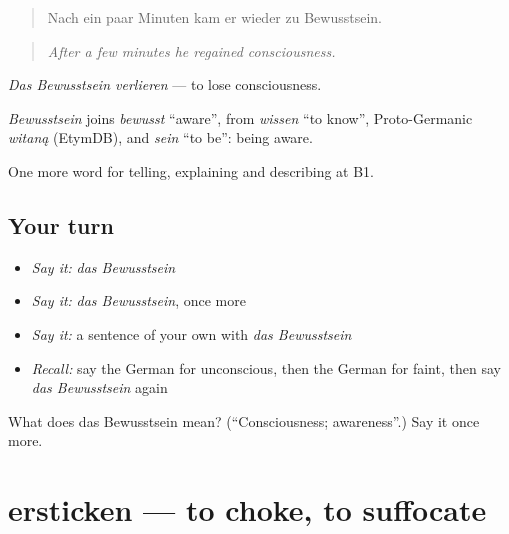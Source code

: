 \begin{quote}
Nach ein paar Minuten kam er wieder zu Bewusstsein.
\end{quote}

\begin{quote}
\emph{After a few minutes he regained consciousness.}
\end{quote}

\emph{Das Bewusstsein verlieren} — to lose consciousness.

\begin{cousinweb}
\emph{Bewusstsein} joins \emph{bewusst} \textquotedblleft{}aware\textquotedblright{}, from \emph{wissen} \textquotedblleft{}to know\textquotedblright{}, Proto-Germanic \emph{witaną} (EtymDB), and \emph{sein} \textquotedblleft{}to be\textquotedblright{}: being aware.
\end{cousinweb}

\begin{grammarlens}[title={What you've built}]
One more word for telling, explaining and describing at B1.
\end{grammarlens}

\subsection*{Your turn}
\begin{itemize}
\raggedright
  \item \emph{Say it:} \emph{das Bewusstsein}
  \item \emph{Say it:} \emph{das Bewusstsein}, once more
  \item \emph{Say it:} a sentence of your own with \emph{das Bewusstsein}
  \item \emph{Recall:} say the German for unconscious, then the German for faint, then say \emph{das Bewusstsein} again
\end{itemize}

\begin{tcolorbox}[breakable,colback=teal!4,colframe=teal!35!black,title={Before you move on}]
What does das Bewusstsein mean? (\textquotedblleft{}Consciousness; awareness\textquotedblright{}.) Say it once more.
\end{tcolorbox}
\section[ersticken]{ersticken — to choke, to suffocate}

\label{lesson:GE-C290-ersticken}




